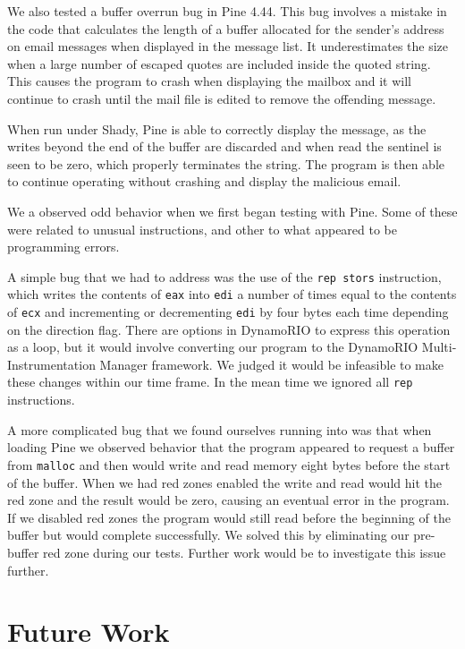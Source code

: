 \documentclass{article}
\newcommand{\code}[1]{\texttt{#1}}
\begin{document}
We also tested a buffer overrun bug in Pine 4.44.  This bug involves a mistake in the code that calculates the length of a buffer allocated for the sender's address on email messages when displayed in the message list.  It underestimates the size when a large number of escaped quotes are included inside the quoted string.  This causes the program to crash when displaying the mailbox and it will continue to crash until the mail file is edited to remove the offending message.

When run under Shady, Pine is able to correctly display the message, as the writes beyond the end of the buffer are discarded and when read the sentinel is seen to be zero, which properly terminates the string.  The program is then able to continue operating without crashing and display the malicious email.

We a observed odd behavior when we first began testing with Pine.  Some of these were related to unusual instructions, and other to what appeared to be programming errors.

A simple bug that we had to address was the use of the \code{rep stors} instruction, which writes the contents of \code{eax} into \code{edi} a number of times equal to the contents of \code{ecx} and incrementing or decrementing \code{edi} by four bytes each time depending on the direction flag.  There are options in DynamoRIO to express this operation as a loop, but it would involve converting our program to the DynamoRIO Multi-Instrumentation Manager framework.  We judged it would be infeasible to make these changes within our time frame.  In the mean time we ignored all \code{rep} instructions.

A more complicated bug that we found ourselves running into was that when loading Pine we observed behavior that the program appeared to request a buffer from \code{malloc} and then would write and read memory eight bytes before the start of the buffer.  When we had red zones enabled the write and read would hit the red zone and the result would be zero, causing an eventual error in the program.  If we disabled red zones the program would still read before the beginning of the buffer but would complete successfully.  We solved this by eliminating our pre-buffer red zone during our tests.  Further work would be to investigate this issue further.


\section{Future Work} %
\label{sec:Future Work}
\end{document}

